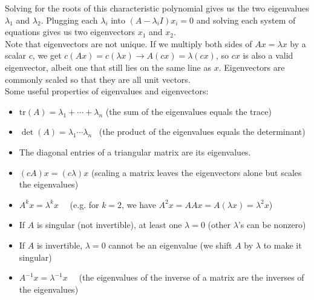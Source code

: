 \documentclass[11pt]{article}
\theoremstyle{plain}
\theoremstyle{definition}
\theoremstyle{remark}
\numberwithin{equation}{section}
\begin{document}
Solving for the roots of this characteristic polynomial gives us the two eigenvalues $\lambda_1$ and $\lambda_2$. Plugging each $\lambda_i$ into $(A - \lambda_i I) x_i = 0$ and solving each system of equations gives us two eigenvectors $x_1$ and $x_2$.
\\

Note that eigenvectors are not unique. If we multiply both sides of $A x = \lambda x$ by a scalar $c$, we get $c (A x) = c (\lambda x) \rightarrow A(cx) = \lambda (cx)$, so $cx$ is also a valid eigenvector, albeit one that still lies on the same line as $x$. Eigenvectors are commonly scaled so that they are all unit vectors.
\\

Some useful properties of eigenvalues and eigenvectors:
\begin{itemize}[noitemsep] %
\item $\text{tr}(A) = \lambda_1 + \cdots + \lambda_n$ \quad  (the sum of the eigenvalues equals the trace)
\item $\det (A) = \lambda_1 \cdots \lambda_n$ \ \qquad (the product of the eigenvalues equals the determinant)
\item The diagonal entries of a triangular matrix are its eigenvalues.
\item $(c A) x = (c \lambda) x$ \quad (scaling a matrix leaves the eigenvectors alone but scales the eigenvalues)
\item $A^k x = \lambda^k x$ \qquad \ \ (e.g. for $k = 2$, we have  $A^2 x= A A x = A (\lambda x) = \lambda^2 x$)
\item If $A$ is singular (not invertible), at least one $\lambda = 0$ (other $\lambda$'s can be nonzero)
\item If $A$ is invertible, $\lambda = 0$ cannot be an eigenvalue (we shift $A$ by $\lambda$ to make it singular)
\item $A^{-1} x = \lambda^{-1} x$ \ \ (the eigenvalues of the inverse of a matrix are the inverses of the eigenvalues)
\end{itemize}









\end{document}
